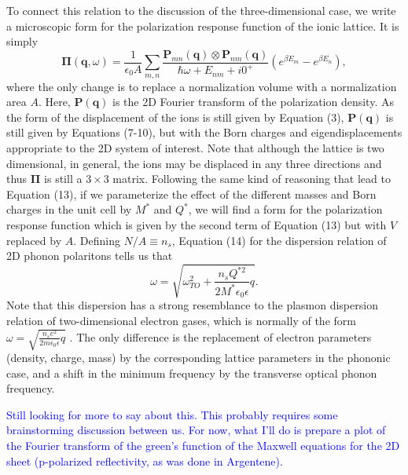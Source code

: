 \documentclass[superscriptaddress,reprint,prb]{revtex4-1}
\begin{document}
To connect this relation to the discussion of the three-dimensional case, we write a microscopic form for the polarization response function of the ionic lattice. It is simply
\begin{equation}
\boldsymbol{\Pi}(\mathbf{q},\omega) =  \frac{1}{\epsilon_0 A}\sum\limits_{m,n}\frac{\mathbf{P}_{mn}(\mathbf{q})\otimes\mathbf{P}_{nm}(\mathbf{q})}{\hbar\omega + E_{nm}+i0^+}\left(e^{\beta E_m}-e^{\beta E_n} \right),
\end{equation}
where the only change is to replace a normalization volume with a normalization area $A$. Here, $\mathbf{P}(\mathbf{q})$ is the 2D Fourier transform of the polarization density. As the form of the displacement of the ions is still given by Equation (3), $\mathbf{P}(\mathbf{q})$ is still given by Equations (7-10), but with the Born charges and eigendisplacements appropriate to the 2D system of interest. Note that although the lattice is two dimensional, in general, the ions may be displaced in any three directions and thus $\boldsymbol{\Pi}$ is still a $3\times3$ matrix. Following the same kind of reasoning that lead to Equation (13), if we parameterize the effect of the different masses and Born charges in the unit cell by $M^*$ and $Q^*$, we will find a form for the polarization response function which is given by the second term of Equation (13) but with $V$ replaced by $A$. Defining $N/A \equiv n_s$, Equation (14) for the dispersion relation of 2D phonon polaritons tells us that
\begin{equation}
\omega = \sqrt{\omega_{TO}^2+\frac{n_sQ^{*2}}{2M^*\epsilon_0\epsilon}q}.
\end{equation}
Note that this dispersion has a strong resemblance to the plasmon dispersion relation of two-dimensional electron gases, which is normally of the form $\omega = \sqrt{\frac{n_s e^2  }{2m\epsilon_0\epsilon}q}$ \cite{stern1967polarizability}. The only difference is the replacement of electron parameters (density, charge, mass) by the corresponding lattice parameters in the phononic case, and a shift in the minimum frequency by the transverse optical phonon frequency.

\textcolor{blue}{Still looking for more to say about this. This probably requires some brainstorming discussion between us. For now, what I'll do is prepare a plot of the Fourier transform of the green's function of the Maxwell equations for the 2D sheet (p-polarized reflectivity, as was done in Argentene).} 
\end{document}
